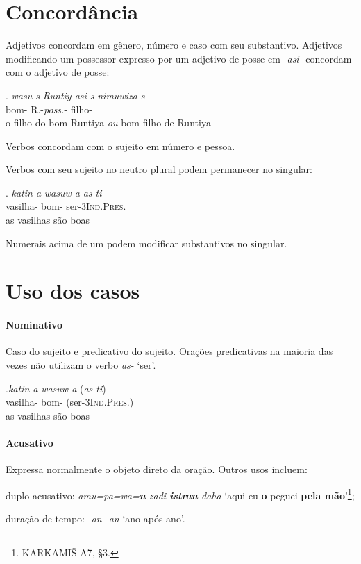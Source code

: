 
\section{Concordância}

Adjetivos concordam em gênero, número e caso com seu
substantivo.
Adjetivos modificando um possessor expresso por um adjetivo de posse em
\emph{-asi-} concordam com o adjetivo de posse:

\exg. \emph{wasu-s} \emph{Runtiy-asi-s} \emph{nimuwiza-s}\\
bom-\Nom\Sg\Com{} R.-\emph{poss.}-\Nom\Sg\Com{} filho-\Nom{}\Sg\Com{}\\
o filho do bom Runtiya \emph{ou} bom filho de Runtiya


\noindent Verbos concordam com o sujeito em número e pessoa.

Verbos com seu sujeito no neutro plural podem permanecer no singular:

\exg. \emph{katin-a} \emph{wasuw-a} \emph{as-ti}\\
vasilha-\Nom\Pl\Neut{} bom-\Nom\Pl\Neut{} ser-3\Sg\textsc{Ind.Pres.}\\
as vasilhas são boas


\noindent Numerais acima de um podem modificar substantivos no singular.


\section{Uso dos casos}

\paragraph{Nominativo}
Caso do sujeito e predicativo do sujeito.
Orações predicativas na maioria das vezes não utilizam o verbo \emph{as-} `ser'.

\exg.\emph{katin-a} \emph{wasuw-a} (\emph{as-ti})\\
vasilha-\Nom\Pl\Neut{} bom-\Nom\Pl\Neut{} (ser-3\Sg\textsc{Ind.Pres.})\\
as vasilhas são boas


\paragraph{Acusativo}
Expressa normalmente o objeto direto da oração.
Outros usos incluem:
\begin{inparaenum}[(a)]
	\item duplo acusativo:
	\emph{amu=pa=wa=\textbf{n} zadi \textbf{istran} daha}
	`aqui eu \textbf{o} peguei \textbf{pela mão}'\footnote{KARKAMIŠ A7, §3.};
	\item duração de tempo: \emph{-an -an} `ano após
	ano'.
\end{inparaenum}
\clearpage


